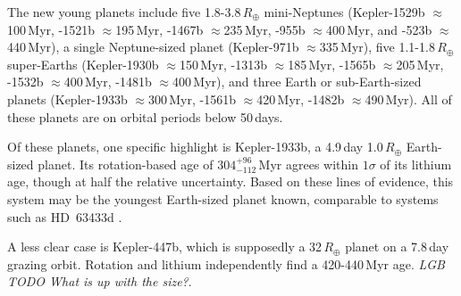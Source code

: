 \documentclass[11pt,twocolumn,tighten]{aastex63}
\begin{document}
The new young planets
include five 1.8-3.8\,$R_\oplus$ mini-Neptunes
(Kepler-1529b $\approx$100\,Myr,
-1521b $\approx$195\,Myr,
-1467b $\approx$235\,Myr,
-955b $\approx$400\,Myr, and
-523b $\approx$440\,Myr),
a single Neptune-sized planet
(Kepler-971b $\approx$335\,Myr),
five 1.1-1.8\,$R_\oplus$ super-Earths
(Kepler-1930b $\approx$150\,Myr,
-1313b $\approx$185\,Myr,
-1565b $\approx$205\,Myr,
-1532b $\approx$400\,Myr,
-1481b $\approx$400\,Myr),
and three Earth or sub-Earth-sized planets
(Kepler-1933b $\approx$300\,Myr,
-1561b $\approx$420\,Myr,
-1482b $\approx$490\,Myr).
All of these planets are on orbital periods below 50\,days.

Of these planets, one specific highlight is Kepler-1933b, a 4.9\,day
1.0\,$R_\oplus$ Earth-sized planet.  Its rotation-based age of
$304^{+96}_{-112}$\,Myr agrees within $1\sigma$ of its lithium age,
though at half the relative uncertainty.  Based on these lines of
evidence, this system may be the youngest Earth-sized planet known,
comparable to systems such as HD~63433d \citep[1.1\,$R_\oplus$,
$414\pm23$\,Myr][]{2024AJ....167...54C}.

A less clear case is Kepler-447b, which is supposedly a 32\,$R_\oplus$
planet on a 7.8\,day grazing orbit.  Rotation and lithium independently
find a 420-440\,Myr age.  {\it LGB TODO What is up with the size?}.
\end{document}
